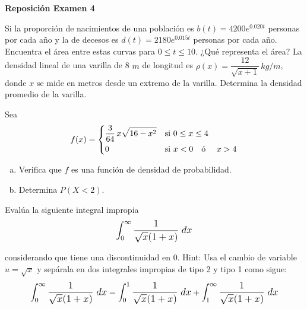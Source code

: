 \documentclass[12pt]{exam}
\begin{document}
\newpage
\begin{center}
\Large 
\textbf{Reposición Examen 4}
\end{center}{}
\normalsize

\begin{questions}
        \question Si la proporción de nacimientos de una población es $b(t)=4200e^{0.020t}$ personas por cada año y la de decesos es $d(t)=2180e^{0.015t}$ personas por cada año. Encuentra el área entre estas curvas para $0\leq t\leq 10$. ¿Qué representa el área?
\vskip12pt
        \question La densidad lineal de una varilla de 8 $m$ de longitud es $\rho(x)=\dfrac{12}{\sqrt{x+1}} \, kg/m$, donde $x$ se mide en metros desde un extremo de la varilla. Determina la densidad promedio de la varilla. 
\vskip12pt

    \question 
    Sea $$ f(x) = \begin{dcases} \dfrac{3}{64}\,x\sqrt{16-x^2} & \text{si } 0 \leq x \leq 4 \\ 0 & \text{si } x < 0 \quad \text{ó }\quad  x > 4 \end{dcases}$$
    \begin{enumerate}[a)]
    \item Verifica que $f$ es una función de densidad de probabilidad.
    \item Determina $P(X<2)$.
\end{enumerate}
 \vskip12pt       
\question Evalúa la siguiente integral impropia 
    $$\mathlarger{\int_0^{\infty} \frac{1}{\sqrt{x}(1+x)}\;dx}$$
    
    considerando que tiene una discontinuidad en 0. Hint: Usa el cambio de variable $u=\sqrt{x}$ y sepárala en dos integrales impropias de tipo 2 y tipo 1 como sigue: 
        $$\mathlarger{\int_0^{\infty} \frac{1}{\sqrt{x}(1+x)}\;dx}=\mathlarger{\int_0^1 \frac{1}{\sqrt{x}(1+x)}\;dx}+\mathlarger{\int_1^{\infty} \frac{1}{\sqrt{x}(1+x)}\;dx}$$
\end{questions}{}







\pagestyle{foot}    %



\end{document}
